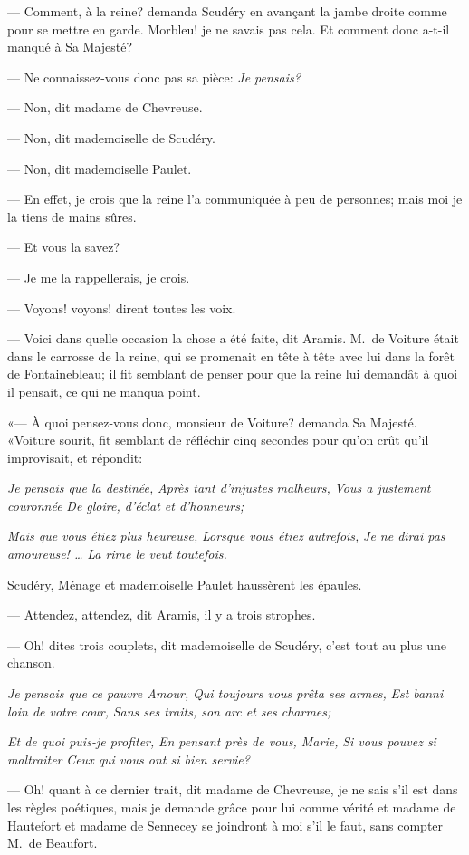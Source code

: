 — Comment, à la reine? demanda Scudéry en avançant la jambe droite comme pour se mettre en garde. Morbleu! je ne savais pas cela. Et comment donc a-t-il manqué à Sa Majesté?

— Ne connaissez-vous donc pas sa pièce:\textit{ Je pensais?}

— Non, dit madame de Chevreuse.

— Non, dit mademoiselle de Scudéry.

— Non, dit mademoiselle Paulet.

— En effet, je crois que la reine l'a communiquée à peu de personnes; mais moi je la tiens de mains sûres.

— Et vous la savez?

— Je me la rappellerais, je crois.

— Voyons! voyons! dirent toutes les voix.

— Voici dans quelle occasion la chose a été faite, dit Aramis. M.~de Voiture était dans le carrosse de la reine, qui se promenait en tête à tête avec lui dans la forêt de Fontainebleau; il fit semblant de penser pour que la reine lui demandât à quoi il pensait, ce qui ne manqua point.

«— À quoi pensez-vous donc, monsieur de Voiture? demanda Sa Majesté.
«Voiture sourit, fit semblant de réfléchir cinq secondes pour qu'on crût qu'il improvisait, et répondit:

\textit{Je pensais que la destinée,} \textit{Après tant d'injustes malheurs,} \textit{Vous a justement couronnée} \textit{De gloire, d'éclat et d'honneurs;}

\textit{Mais que vous étiez plus heureuse,} \textit{Lorsque vous étiez autrefois,} \textit{Je ne dirai pas amoureuse! \dots} \textit{La rime le veut toutefois.}

Scudéry, Ménage et mademoiselle Paulet haussèrent les épaules.

— Attendez, attendez, dit Aramis, il y a trois strophes.

— Oh! dites trois couplets, dit mademoiselle de Scudéry, c'est tout au plus une chanson.

\textit{Je pensais que ce pauvre Amour,} \textit{Qui toujours vous prêta ses armes,} \textit{Est banni loin de votre cour,} \textit{Sans ses traits, son arc et ses charmes;}

\textit{Et de quoi puis-je profiter,} \textit{En pensant près de vous, Marie,} \textit{Si vous pouvez si maltraiter} \textit{Ceux qui vous ont si bien servie?}

— Oh! quant à ce dernier trait, dit madame de Chevreuse, je ne sais s'il est dans les règles poétiques, mais je demande grâce pour lui comme vérité et madame de Hautefort et madame de Sennecey se joindront à moi s'il le faut, sans compter M.~de Beaufort.

